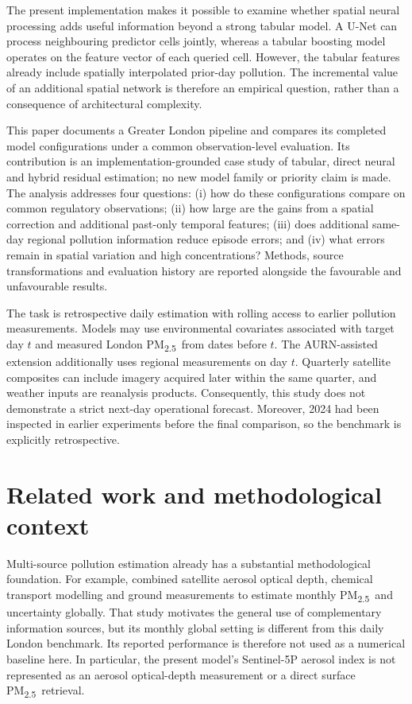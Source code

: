 \documentclass[11pt,a4paper]{article}
\newcommand{\pmfine}{PM\textsubscript{2.5}}
\begin{document}
The present implementation makes it possible to examine whether spatial neural
processing adds useful information beyond a strong tabular model. A U-Net can
process neighbouring predictor cells jointly, whereas a tabular boosting model
operates on the feature vector of each queried cell. However, the tabular
features already include spatially interpolated prior-day pollution. The
incremental value of an additional spatial network is therefore an empirical
question, rather than a consequence of architectural complexity.

This paper documents a Greater London pipeline and compares its completed
model configurations under a common observation-level evaluation. Its
contribution is an implementation-grounded case study of tabular, direct neural
and hybrid residual estimation; no new model family or priority claim is made.
The analysis addresses four questions: (i) how do these configurations compare
on common regulatory observations; (ii) how large are the gains from a spatial
correction and additional past-only temporal features; (iii) does additional
same-day regional pollution information reduce episode errors; and (iv) what
errors remain in spatial variation and high concentrations?
Methods, source transformations and evaluation history are reported alongside
the favourable and unfavourable results.

The task is retrospective daily estimation with rolling access to earlier
pollution measurements. Models may use environmental covariates associated
with target day $t$ and measured London \pmfine\ from dates before $t$. The
AURN-assisted extension additionally uses regional measurements on day $t$.
Quarterly
satellite composites can include imagery acquired later within the same
quarter, and weather inputs are reanalysis products. Consequently, this study
does not demonstrate a strict next-day operational forecast. Moreover, 2024
had been inspected in earlier experiments before the final comparison, so the
benchmark is explicitly retrospective.

\section{Related work and methodological context}
Multi-source pollution estimation already has a substantial methodological
foundation. For example, \citet{vandonkelaar2021} combined satellite aerosol
optical depth, chemical transport modelling and ground measurements to
estimate monthly \pmfine\ and uncertainty globally. That study motivates the
general use of complementary information sources, but its monthly global
setting is different from this daily London benchmark. Its reported
performance is therefore not used as a numerical baseline here. In particular,
the present model's Sentinel-5P aerosol index is not represented as an aerosol
optical-depth measurement or a direct surface \pmfine\ retrieval.
\end{document}
